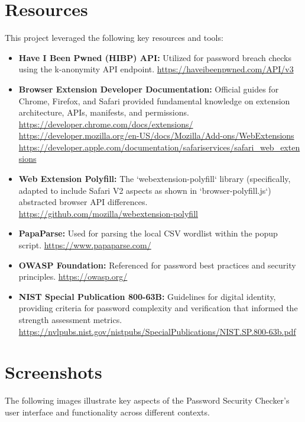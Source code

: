 \documentclass[11pt,oneside,a4paper]{book}
\newcommand{\extensionname}{Password Security Checker}
\begin{document}
\begin{itemize}
\chapter{Resources}
This project leveraged the following key resources and tools:

\begin{itemize}
    \item \textbf{Have I Been Pwned (HIBP) API:} Utilized for password breach checks using the k-anonymity API endpoint. \newline
    \url{https://haveibeenpwned.com/API/v3}
    \item \textbf{Browser Extension Developer Documentation:} Official guides for Chrome, Firefox, and Safari provided fundamental knowledge on extension architecture, APIs, manifests, and permissions. \newline
    \url{https://developer.chrome.com/docs/extensions/} \newline
    \url{https://developer.mozilla.org/en-US/docs/Mozilla/Add-ons/WebExtensions} \newline
    \url{https://developer.apple.com/documentation/safariservices/safari_web_extensions}
    \item \textbf{Web Extension Polyfill:} The `webextension-polyfill` library (specifically, adapted to include Safari V2 aspects as shown in `browser-polyfill.js`) abstracted browser API differences. \newline
    \url{https://github.com/mozilla/webextension-polyfill}
    \item \textbf{PapaParse:} Used for parsing the local CSV wordlist within the popup script. \newline
    \url{https://www.papaparse.com/}
    \item \textbf{OWASP Foundation:} Referenced for password best practices and security principles. \newline
    \url{https://owasp.org/}
    \item \textbf{NIST Special Publication 800-63B:} Guidelines for digital identity, providing criteria for password complexity and verification that informed the strength assessment metrics. \newline
    \url{https://nvlpubs.nist.gov/nistpubs/SpecialPublications/NIST.SP.800-63b.pdf}
\end{itemize}

\chapter{Screenshots}
The following images illustrate key aspects of the \extensionname's user interface and functionality across different contexts.



\end{itemize}
\end{document}

